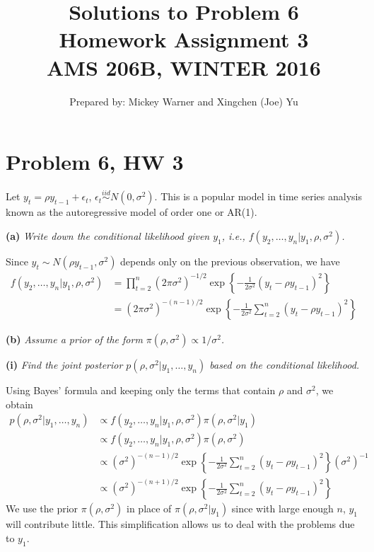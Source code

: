 \documentclass[12pt]{article}
\begin{document}
\title{Solutions to Problem 6 \\
Homework Assignment 3 \\
{\small {\bf AMS 206B, WINTER 2016 }} \\
}

\author{Prepared by: Mickey Warner and Xingchen (Joe) Yu}

\maketitle

\section*{Problem 6, HW 3}
\noindent Let $y_t=\rho y_{t-1} + \epsilon_t$, $\epsilon_t \overset{iid}\sim N(0,\sigma^2)$. This is a popular model in time series analysis known as the autoregressive model of order one or AR(1).
\bigskip

\noindent \textbf{(a)} \emph{Write down the conditional likelihood given $y_1$, i.e., $f(y_2,\ldots,y_n|y_1,\rho,\sigma^2)$.}
\bigskip

\noindent Since $y_t \sim N(\rho y_{t-1}, \sigma^2)$ depends only on the previous observation, we have
\begin{align*}
f(y_2,\ldots,y_n|y_1,\rho,\sigma^2) &= \prod_{t=2}^n (2\pi\sigma^2)^{-1/2}\exp\left\{-\frac{1}{2\sigma^2}(y_t-\rho y_{t-1})^2\right\} \\
&= (2\pi\sigma^2)^{-(n-1)/2} \exp\left\{-\frac{1}{2\sigma^2}\sum_{t=2}^n(y_t-\rho y_{t-1})^2\right\}
\end{align*}

\bigskip
\noindent \textbf{(b)} \emph{Assume a prior of the form $\pi(\rho, \sigma^2) \propto 1/\sigma^2$.}
\bigskip

\noindent \textbf{(i)} \emph{Find the joint posterior $p(\rho, \sigma^2|y_1,\ldots, y_n)$ based on the conditional likelihood.}
\bigskip

\noindent Using Bayes' formula and keeping only the terms that contain $\rho$ and $\sigma^2$, we obtain
\begin{align*}
p(\rho, \sigma^2|y_1, \ldots, y_n) &\propto f(y_2,\ldots,y_n|y_1,\rho,\sigma^2)\pi(\rho,\sigma^2|y_1) \\
&\propto f(y_2,\ldots,y_n|y_1,\rho,\sigma^2)\pi(\rho,\sigma^2) \\
&\propto (\sigma^2)^{-(n-1)/2} \exp\left\{-\frac{1}{2\sigma^2}\sum_{t=2}^n(y_t-\rho y_{t-1})^2\right\}(\sigma^2)^{-1} \\
&\propto (\sigma^2)^{-(n+1)/2} \exp\left\{-\frac{1}{2\sigma^2}\sum_{t=2}^n(y_t-\rho y_{t-1})^2\right\}
\end{align*}
\noindent We use the prior $\pi(\rho,\sigma^2)$ in place of $\pi(\rho,\sigma^2|y_1)$ since with large enough $n$, $y_1$ will contribute little. This simplification allows us to deal with the problems due to $y_1$.
\end{document}
